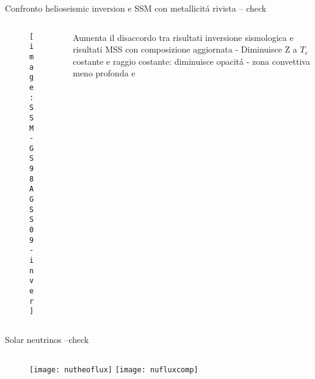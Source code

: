 \begin{frame}{Confronto helioseismic inversion e SSM con metallicit\'a rivista -- check}
\begin{columns}[T]
	\begin{column}{0.5\textwidth}
		\begin{figure}[!ht]%
			\texttt{[image: SSM-GS98AGSS09-inver]}
		\end{figure}
	\end{column}
	\begin{column}{0.42\textwidth}
Aumenta il disaccordo tra risultati inversione sismologica e risultati MSS con composizione aggiornata - Diminuisce Z a $T_e$ costante e raggio costante: diminuisce opacit\'a - zona convettiva meno profonda e 
	\end{column}
\end{columns}
\end{frame}

\begin{frame}{Solar neutrinos --check }
\begin{columns}[T]
	\begin{column}{0.5\textwidth}
		\begin{figure}[!ht]%
			\texttt{[image: nutheoflux]}
				\texttt{[image: nufluxcomp]}
		\end{figure}
	\end{column}
	\begin{column}{0.5\textwidth}

	\end{column}
\end{columns}
\end{frame}
